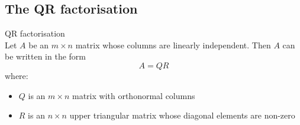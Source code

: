 \documentclass[journal, letterpaper]{IEEEtran}
\begin{document}
    \subsection{The QR factorisation}
    \begin{mybox}{QR factorisation} \\ 
        Let $A$ be an $m \times n$ matrix whose columns are linearly independent. Then $A$ can be written in the form
        $$ A = QR$$
        where:
        \begin{itemize}
            \item $Q$ is an $m \times n$ matrix with orthonormal columns
            \item $R$ is an $n \times n$ upper triangular matrix whose diagonal elements are non-zero
        \end{itemize}
    \end{mybox}
\end{document}
